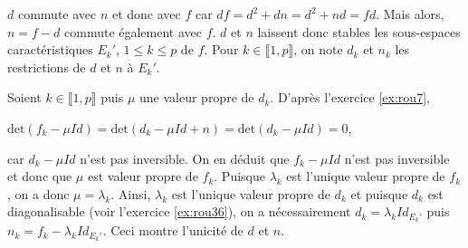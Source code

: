 {{$d$ commute avec $n$ et donc avec $f$ car $df= d^2+dn = d^2+nd = fd$. Mais alors, $n=f-d$ commute également avec $f$. $d$ et $n$ laissent donc stables les sous-espaces caractéristiques $E_k'$, $1\leqslant k\leqslant p$ de $f$. Pour $k\in\llbracket1,p\rrbracket$, on note $d_k$ et $n_k$ les restrictions de $d$ et $n$ à $E_k'$.

Soient $k\in\llbracket1,p\rrbracket$ puis $\mu$ une valeur propre de $d_k$. D'après l'exercice \ref{ex:rou7},

\begin{center}
$\text{det}(f_k-\mu Id)=\text{det}(d_k-\mu Id+n)=\text{det}(d_k-\mu Id)=0$,
\end{center}

car $d_k-\mu Id$ n'est pas inversible. On en déduit que $f_k-\mu Id$ n'est pas inversible et donc que $\mu$ est valeur propre de $f_k$. Puisque $\lambda_k$ est l'unique valeur propre de $f_k$, on a donc $\mu=\lambda_k$. Ainsi, $\lambda_k$ est l'unique valeur propre de $d_k$ et puisque $d_k$ est diagonalisable (voir l'exercice \ref{ex:rou36}), on a nécessairement $d_k=\lambda_kId_{E_k'}$ puis $n_k=f_k-\lambda_k Id_{E_k'}$. Ceci montre l'unicité de $d$ et $n$.
}
}
